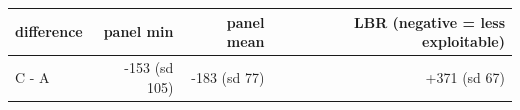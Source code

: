 \begin{tabular}{lrrr}
\toprule
difference & panel min & panel mean & LBR (negative = less exploitable) \\
\midrule
C - A & -153 (sd 105) & -183 (sd 77) & +371 (sd 67) \\
\bottomrule
\end{tabular}
